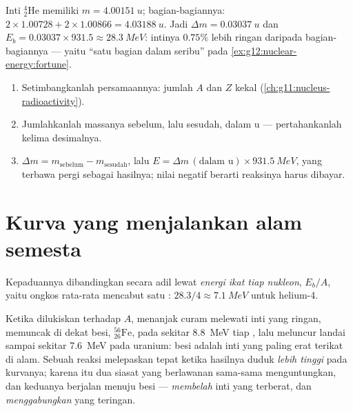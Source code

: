 \begin{example}[Helium-4]\label{ex:g12:nuclear-energy:helium}
Inti ${}^{4}_{2}\mathrm{He}$ memiliki $m = \qty{4.00151}{u}$; bagian-bagiannya:
$2 \times 1.00728 + 2 \times 1.00866 = \qty{4.03188}{u}$. Jadi
$\Delta m = \qty{0.03037}{u}$ dan $E_b = 0.03037 \times 931.5 \approx
\qty{28.3}{MeV}$: intinya $0.75\%$ lebih ringan daripada bagian-bagiannya --- yaitu
``satu bagian dalam seribu'' pada \cref{ex:g12:nuclear-energy:fortune}.
\end{example}

\begin{method}\label{met:g12:nuclear-energy:balance}
\begin{enumerate}
  \item Setimbangkanlah persamaannya: jumlah $A$ dan $Z$ kekal (\cref{ch:g11:nucleus-radioactivity}).
  \item Jumlahkanlah massanya sebelum, lalu sesudah, dalam \unit{u} --- pertahankanlah kelima desimalnya.
  \item $\Delta m = m_{\text{sebelum}} - m_{\text{sesudah}}$, lalu
        $E = \Delta m\,(\text{dalam u}) \times \qty{931.5}{MeV}$, yang terbawa pergi sebagai
         hasilnya; nilai negatif berarti reaksinya harus dibayar.
\end{enumerate}
\end{method}

\section{Kurva yang menjalankan alam semesta}

\begin{definition}\label{def:g12:nuclear-energy:pernucleon}
Kepaduannya dibandingkan secara adil lewat \emph{energi ikat tiap
nukleon}, $E_b/A$, yaitu ongkos rata-rata
mencabut satu : $28.3/4 \approx \qty{7.1}{MeV}$ untuk helium-4.
\end{definition}

\begin{proposition}\label{prop:g12:nuclear-energy:ironpeak}
Ketika dilukiskan terhadap $A$,  menanjak curam melewati
inti yang ringan, memuncak di dekat besi, ${}^{56}_{26}\mathrm{Fe}$, pada sekitar
\qty{8.8}{MeV} tiap , lalu meluncur landai sampai sekitar \qty{7.6}{MeV} pada
uranium: besi adalah inti yang paling erat terikat di alam. Sebuah reaksi
melepaskan  tepat ketika hasilnya duduk \emph{lebih tinggi} pada kurvanya; karena itu dua
siasat yang berlawanan sama-sama menguntungkan, dan keduanya berjalan menuju besi ---
\emph{membelah} inti yang terberat, dan \emph{menggabungkan} yang teringan.
\end{proposition}
\admitted

